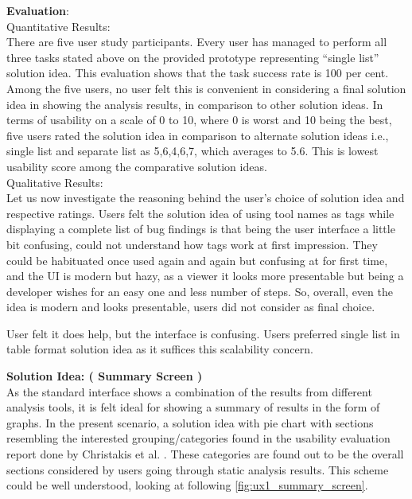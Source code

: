 \textbf{Evaluation}: \\

Quantitative Results: \\

There are five user study participants. Every user has managed to perform all three tasks stated above on the provided prototype representing “single list” solution idea. This evaluation shows that the task success rate is 100 per cent. \\
Among the five users, no user felt this is convenient in considering a final solution idea in showing the analysis results, in comparison to other solution ideas.  In terms of usability on a scale of 0 to 10, where 0 is worst and 10 being the best, five users rated the solution idea in comparison to alternate solution ideas i.e., single list and separate list as 5,6,4,6,7, which averages to 5.6. This is lowest usability score among the comparative solution ideas. \\

Qualitative Results: \\

Let us now investigate the reasoning behind the user’s choice of solution idea and respective ratings. Users felt the solution idea of using tool names as tags while displaying a complete list of bug findings is that being the user interface a little bit confusing, could not understand how tags work at first impression. They could be habituated once used again and again but confusing at for first time, and the UI is modern but hazy, as a viewer it looks more presentable but being a developer wishes for an easy one and less number of steps. So, overall, even the idea is modern and looks presentable, users did not consider as final choice. \\


\begin{myboxi}
User felt it does help, but the interface is confusing. Users preferred single list in table format solution idea as it suffices this scalability concern.
\end{myboxi}


\textbf{Solution Idea: ( Summary Screen )} \\

As the standard interface shows a combination of the results from different analysis tools, it is felt ideal for showing a summary of results in the form of graphs. In the present scenario, a solution idea with pie chart with sections resembling the interested grouping/categories found in the usability evaluation report done by Christakis et al. \cite{CB16}. These categories are found out to be the overall sections considered by users going through static analysis results.  This scheme could be well understood, looking at following \autoref{fig:ux1_summary_screen}. \\


